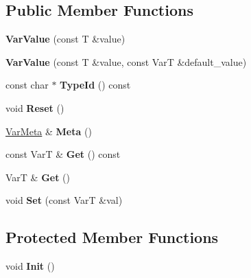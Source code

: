 \subsection*{Public Member Functions}
\begin{DoxyCompactItemize}
\item 
{\bfseries Var\+Value} (const T \&value)\hypertarget{classpangolin_1_1_var_value_a40b682384d10b19f0ce5621988f86745}{}\label{classpangolin_1_1_var_value_a40b682384d10b19f0ce5621988f86745}

\item 
{\bfseries Var\+Value} (const T \&value, const VarT \&default\+\_\+value)\hypertarget{classpangolin_1_1_var_value_aed1387627a75f1eeb290793484ba72a3}{}\label{classpangolin_1_1_var_value_aed1387627a75f1eeb290793484ba72a3}

\item 
const char $\ast$ {\bfseries Type\+Id} () const \hypertarget{classpangolin_1_1_var_value_ae4a3ef3daea7d4944c0acfe959dd9a31}{}\label{classpangolin_1_1_var_value_ae4a3ef3daea7d4944c0acfe959dd9a31}

\item 
void {\bfseries Reset} ()\hypertarget{classpangolin_1_1_var_value_a23d1da24e04e208b001890a8306dc19b}{}\label{classpangolin_1_1_var_value_a23d1da24e04e208b001890a8306dc19b}

\item 
\hyperlink{structpangolin_1_1_var_meta}{Var\+Meta} \& {\bfseries Meta} ()\hypertarget{classpangolin_1_1_var_value_af0cf22287e926a9dfeac0eff315b45cd}{}\label{classpangolin_1_1_var_value_af0cf22287e926a9dfeac0eff315b45cd}

\item 
const VarT \& {\bfseries Get} () const \hypertarget{classpangolin_1_1_var_value_a93db3d7e9186c0b6808c91cbde3bac75}{}\label{classpangolin_1_1_var_value_a93db3d7e9186c0b6808c91cbde3bac75}

\item 
VarT \& {\bfseries Get} ()\hypertarget{classpangolin_1_1_var_value_a3f3b4f571d0b5117889333ae211e65be}{}\label{classpangolin_1_1_var_value_a3f3b4f571d0b5117889333ae211e65be}

\item 
void {\bfseries Set} (const VarT \&val)\hypertarget{classpangolin_1_1_var_value_a9ba2a183cd8b0d2edde6b6b455be53f1}{}\label{classpangolin_1_1_var_value_a9ba2a183cd8b0d2edde6b6b455be53f1}

\end{DoxyCompactItemize}
\subsection*{Protected Member Functions}
\begin{DoxyCompactItemize}
\item 
void {\bfseries Init} ()\hypertarget{classpangolin_1_1_var_value_ae30fc713f301d5a56ddda7b854c85349}{}\label{classpangolin_1_1_var_value_ae30fc713f301d5a56ddda7b854c85349}

\end{DoxyCompactItemize}
